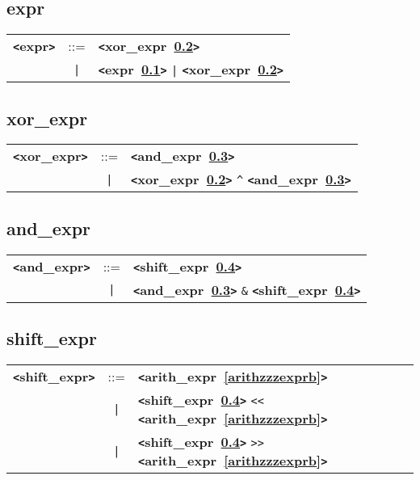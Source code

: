 \documentclass[12pt]{article}
\begin{document}
\subsection{expr}
\label{exprb}
\begin{tabular}{lcl}
{\bf \verb+<+expr\verb+>+} & ::=  & {\bf \verb+<+xor\_expr~\ref{xorzzzexprb}\verb+>+}  \\
 & \verb+|+  & {\bf \verb+<+expr~\ref{exprb}\verb+>+}  \verb+|+ {\bf \verb+<+xor\_expr~\ref{xorzzzexprb}\verb+>+}  \\
\end{tabular}

\subsection{xor\_expr}
\label{xorzzzexprb}
\begin{tabular}{lcl}
{\bf \verb+<+xor\_expr\verb+>+} & ::=  & {\bf \verb+<+and\_expr~\ref{andzzzexprb}\verb+>+}  \\
 & \verb+|+  & {\bf \verb+<+xor\_expr~\ref{xorzzzexprb}\verb+>+}  \verb|^| {\bf \verb+<+and\_expr~\ref{andzzzexprb}\verb+>+}  \\
\end{tabular}

\subsection{and\_expr}
\label{andzzzexprb}
\begin{tabular}{lcl}
{\bf \verb+<+and\_expr\verb+>+} & ::=  & {\bf \verb+<+shift\_expr~\ref{shiftzzzexprb}\verb+>+}  \\
 & \verb+|+  & {\bf \verb+<+and\_expr~\ref{andzzzexprb}\verb+>+}  \verb|&| {\bf \verb+<+shift\_expr~\ref{shiftzzzexprb}\verb+>+}  \\
\end{tabular}

\subsection{shift\_expr}
\label{shiftzzzexprb}
\begin{tabular}{lcl}
{\bf \verb+<+shift\_expr\verb+>+} & ::=  & {\bf \verb+<+arith\_expr~\ref{arithzzzexprb}\verb+>+}  \\
 & \verb+|+  & {\bf \verb+<+shift\_expr~\ref{shiftzzzexprb}\verb+>+}  \verb|<<| {\bf \verb+<+arith\_expr~\ref{arithzzzexprb}\verb+>+}  \\
 & \verb+|+  & {\bf \verb+<+shift\_expr~\ref{shiftzzzexprb}\verb+>+}  \verb|>>| {\bf \verb+<+arith\_expr~\ref{arithzzzexprb}\verb+>+}  \\
\end{tabular}
\end{document}
